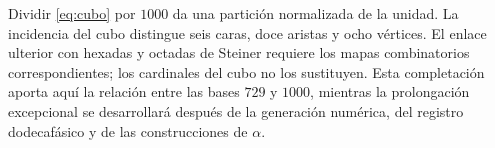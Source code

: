 Dividir \eqref{eq:cubo} por \(1000\) da una partición normalizada de la unidad. La incidencia del cubo distingue seis caras, doce aristas y ocho vértices. El enlace ulterior con hexadas y octadas de Steiner requiere los mapas combinatorios correspondientes; los cardinales del cubo no los sustituyen. Esta completación aporta aquí la relación entre las bases \(729\) y \(1000\), mientras la prolongación excepcional se desarrollará después de la generación numérica, del registro dodecafásico y de las construcciones de \(\alpha\).





